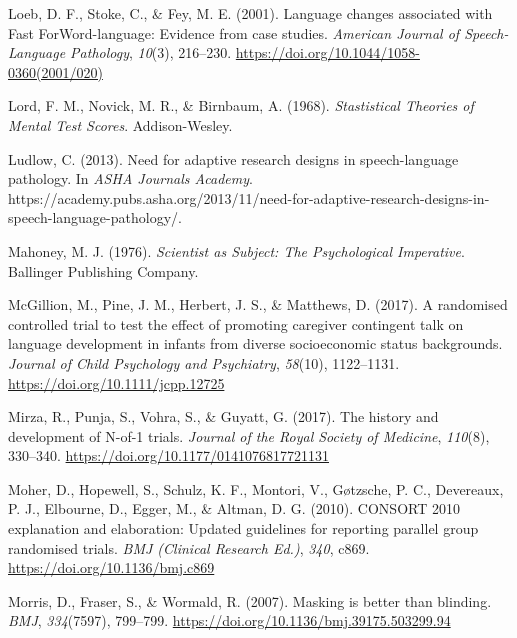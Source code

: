 \documentclass{krantz}
\newlength{\cslhangindent}
\newlength{\cslentryspacingunit} %
\newenvironment{CSLReferences}[2] %
{%
\setlength{\parindent}{0pt}
\ifodd #1
\let\oldpar\par
\def\par{\hangindent=\cslhangindent\oldpar}
\fi
\setlength{\parskip}{#2\cslentryspacingunit}
}%
{}
\begin{document}
\begin{CSLReferences}{1}{0}
\leavevmode{}%
Loeb, D. F., Stoke, C., \& Fey, M. E. (2001). Language changes associated with {Fast ForWord-language}: {Evidence} from case studies. \emph{American Journal of Speech-Language Pathology}, \emph{10}(3), 216--230. \url{https://doi.org/10.1044/1058-0360(2001/020)}

\leavevmode{}%
Lord, F. M., Novick, M. R., \& Birnbaum, A. (1968). \emph{Stastistical {Theories} of {Mental Test Scores}}. {Addison-Wesley}.

\leavevmode{}%
Ludlow, C. (2013). Need for adaptive research designs in speech-language pathology. In \emph{ASHA Journals Academy}. https://academy.pubs.asha.org/2013/11/need-for-adaptive-research-designs-in-speech-language-pathology/.

\leavevmode{}%
Mahoney, M. J. (1976). \emph{Scientist as {Subject}: {The Psychological Imperative}}. {Ballinger Publishing Company}.

\leavevmode{}%
McGillion, M., Pine, J. M., Herbert, J. S., \& Matthews, D. (2017). A randomised controlled trial to test the effect of promoting caregiver contingent talk on language development in infants from diverse socioeconomic status backgrounds. \emph{Journal of Child Psychology and Psychiatry}, \emph{58}(10), 1122--1131. \url{https://doi.org/10.1111/jcpp.12725}

\leavevmode{}%
Mirza, R., Punja, S., Vohra, S., \& Guyatt, G. (2017). The history and development of {N-of-1} trials. \emph{Journal of the Royal Society of Medicine}, \emph{110}(8), 330--340. \url{https://doi.org/10.1177/0141076817721131}

\leavevmode{}%
Moher, D., Hopewell, S., Schulz, K. F., Montori, V., Gøtzsche, P. C., Devereaux, P. J., Elbourne, D., Egger, M., \& Altman, D. G. (2010). {CONSORT} 2010 explanation and elaboration: Updated guidelines for reporting parallel group randomised trials. \emph{BMJ (Clinical Research Ed.)}, \emph{340}, c869. \url{https://doi.org/10.1136/bmj.c869}

\leavevmode{}%
Morris, D., Fraser, S., \& Wormald, R. (2007). Masking is better than blinding. \emph{BMJ}, \emph{334}(7597), 799--799. \url{https://doi.org/10.1136/bmj.39175.503299.94}


\end{CSLReferences}
\end{document}
